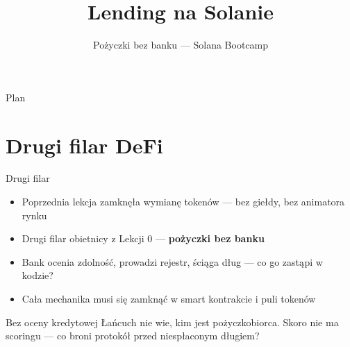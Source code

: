 

\usepackage[utf8]{inputenc}
\usepackage[T1]{fontenc}
\usepackage{amsmath}

\title{Lending na Solanie}
\subtitle{Pożyczki bez banku --- Solana Bootcamp}
\author{}



\maketitleframe

\begin{frame}{Plan}
  \tableofcontents
\end{frame}

\section{Drugi filar DeFi}

\begin{frame}{Drugi filar}
  \begin{itemize}
    \item Poprzednia lekcja zamknęła wymianę tokenów --- bez giełdy, bez animatora rynku
    \item Drugi filar obietnicy z Lekcji 0 --- \textbf{pożyczki bez banku}
    \item Bank ocenia zdolność, prowadzi rejestr, ściąga dług --- co go zastąpi w kodzie?
    \item Cała mechanika musi się zamknąć w smart kontrakcie i puli tokenów
  \end{itemize}
  \vspace{0.25cm}
  \begin{alertblock}{Bez oceny kredytowej}
    Łańcuch nie wie, kim jest pożyczkobiorca. Skoro nie ma scoringu ---
    co broni protokół przed niespłaconym długiem?
  \end{alertblock}
\end{frame}

